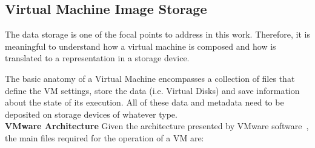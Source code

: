 
\nocite{Nuno2016}
\nocite{Eduardo2016}
\nocite{P2020}


\subsection{Virtual Machine Image Storage} %
\label{sub:res_vm_storage}

The data storage is one of the focal points to address in this work. Therefore, it is meaningful to understand how a virtual machine is composed and how is translated to a representation in a storage device.

The basic anatomy of a Virtual Machine encompasses a collection of files that define the VM settings, store the data (i.e. Virtual Disks) and save information about the state of its execution. All of these data and metadata need to be deposited on storage devices of whatever type. \\

\textbf{VMware Architecture} \quad Given the architecture presented by VMware software~\cite{VMWare_VMFiles}, the main files required for the operation of a VM are:

